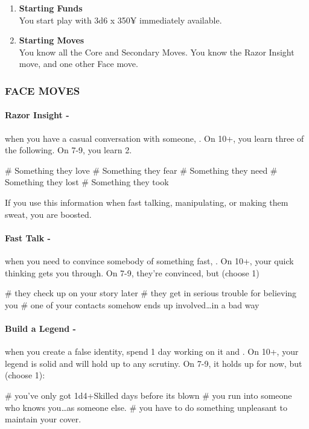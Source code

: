 \begin{enumerate}
    \item \textbf{Starting Funds} \\
    You start play with 3d6 x 350¥ immediately available.
    
    \item \textbf{Starting Moves} \\
    You know all the Core and Secondary Moves. You know the Razor Insight move, and one other Face move.
\end{enumerate}

\subsubsection{FACE MOVES}
\paragraph{Razor Insight -} when you have a casual conversation with someone, . On 10+, you learn three of the following. On 7-9, you learn 2.
    \begin{easylist}
        # Something they love        
        # Something they fear        
        # Something they need        
        # Something they lost        
        # Something they took
    \end{easylist}
If you use this information when fast talking, manipulating, or making them sweat, you are boosted.

\paragraph{Fast Talk -} when you need to convince somebody of something fast, . On 10+, your quick thinking gets you through. On 7-9, they’re convinced, but (choose 1)
    \begin{easylist}
        # they check up on your story later
        # they get in serious trouble for believing you
        # one of your contacts somehow ends up involved…in a bad way   
    \end{easylist}
        
\paragraph{Build a Legend -} when you create a false identity, spend 1 day working on it and . On 10+, your legend is solid and will hold up to any scrutiny. On 7-9, it holds up for now, but (choose 1):
    \begin{easylist}
        # you've only got 1d4+Skilled days before its blown
        # you run into someone who knows you…as someone else.
        # you have to do something unpleasant to maintain your cover.
    \end{easylist}

